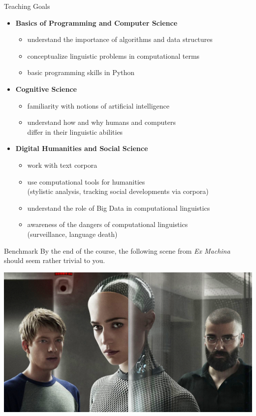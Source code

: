 \documentclass[professionalfonts, xcolor={usenames,svgnames,x11names,table}]{beamer}
\begin{document}
\begin{frame}{Teaching Goals}
    \begin{itemize}
        \item \textbf{Basics of Programming and Computer Science}
            \begin{itemize}
                \item understand the importance of algorithms and data structures
                \item conceptualize linguistic problems in computational terms
                \item basic programming skills in Python
            \end{itemize}
        \pause
        \item \textbf{Cognitive Science}
            \begin{itemize}
                \item familiarity with notions of artificial intelligence
                \item understand how and why humans and computers\\
                    differ in their linguistic abilities
            \end{itemize}
        \pause
        \item \textbf{Digital Humanities and Social Science}
            \begin{itemize}
                \item work with text corpora
                \item use computational tools for humanities\\
                    (stylistic analysis, tracking social developments via corpora)
                \item understand the role of Big Data in computational linguistics
                \item awareness of the dangers of computational linguistics\\
                    (surveillance, language death)
            \end{itemize}
    \end{itemize}
\end{frame}

\begin{frame}{Benchmark}
    By the end of the course, the following scene from \emph{Ex Machina}\\
    should seem rather trivial to you.
    \begin{center} 
         \href{run:exmachina_nlp.mkv}{
            \includegraphics[width=.75\linewidth]{img/exmachina}}
    \end{center}
\end{frame}
\end{document}
